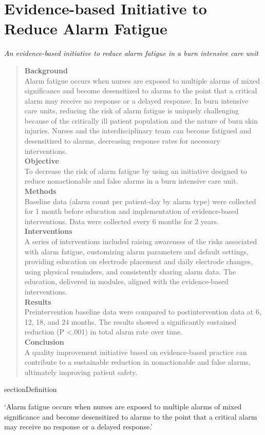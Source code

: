 \chapter{Evidence-based Initiative to Reduce Alarm Fatigue}

\textit{An evidence-based initiative to reduce alarm fatigue in a burn intensive care unit}

\begin{quotation}
	
	\textbf{Background} \\
	
	Alarm fatigue occurs when nurses are exposed to multiple alarms of mixed significance and become desensitized to alarms to the point that a critical alarm may receive no response or a delayed response. In burn intensive care units, reducing the risk of alarm fatigue is uniquely challenging because of the critically ill patient population and the nature of burn skin injuries. Nurses and the interdisciplinary team can become fatigued and desensitized to alarms, decreasing response rates for necessary interventions. \\
	
	\textbf{Objective} \\
	
	To decrease the risk of alarm fatigue by using an initiative designed to reduce nonactionable and false alarms in a burn intensive care unit. \\
	
	\textbf{Methods} \\
	
	Baseline data (alarm count per patient-day by alarm type) were collected for 1 month before education and implementation of evidence-based interventions. Data were collected every 6 months for 2 years. \\
	
	\textbf{Interventions} \\
	
	A series of interventions included raising awareness of the risks associated with alarm fatigue, customizing alarm parameters and default settings, providing education on electrode placement and daily electrode changes, using physical reminders, and consistently sharing alarm data. The education, delivered in modules, aligned with the evidence-based interventions. \\
	
	\textbf{Results} \\
	
	Preintervention baseline data were compared to postintervention data at 6, 12, 18, and 24 months. The results showed a significantly sustained reduction (P \textless .001) in total alarm rate over time. \\
	
	\textbf{Conclusion} \\
	
	A quality improvement initiative based on evidence-based practice can contribute to a sustainable reduction in nonactionable and false alarms, ultimately improving patient safety.
	
\end{quotation}

section{Definition}

`Alarm fatigue occurs when nurses are exposed to multiple alarms of mixed significance and become desensitized to alarms to the point that a critical alarm may receive no response or a delayed response.'
